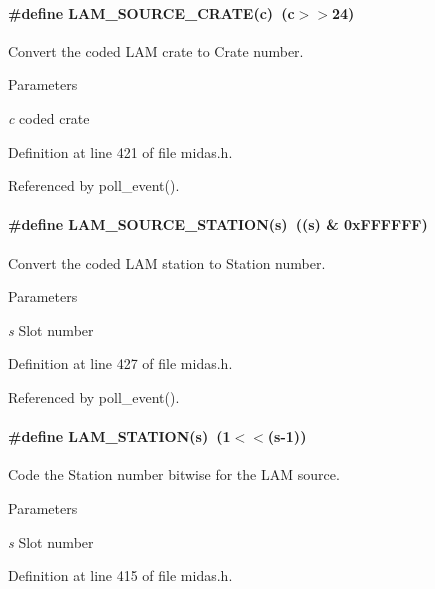 \paragraph[{LAM\_\-SOURCE\_\-CRATE}]{\setlength{\rightskip}{0pt plus 5cm}\#define LAM\_\-SOURCE\_\-CRATE(c)~(c$>$$>$24)}\hfill\label{group__midasincludecode_gafac465450c8035c37ba5482970e026eb}
Convert the coded LAM crate to Crate number. 
\begin{DoxyParams}{Parameters}
\item[{\em c}]coded crate \end{DoxyParams}


Definition at line 421 of file midas.h.

Referenced by poll\_\-event().
\paragraph[{LAM\_\-SOURCE\_\-STATION}]{\setlength{\rightskip}{0pt plus 5cm}\#define LAM\_\-SOURCE\_\-STATION(s)~((s) \& 0xFFFFFF)}\hfill\label{group__midasincludecode_gae70f372186346224788f2980de071736}
Convert the coded LAM station to Station number. 
\begin{DoxyParams}{Parameters}
\item[{\em s}]Slot number \end{DoxyParams}


Definition at line 427 of file midas.h.

Referenced by poll\_\-event().
\paragraph[{LAM\_\-STATION}]{\setlength{\rightskip}{0pt plus 5cm}\#define LAM\_\-STATION(s)~(1$<$$<$(s-\/1))}\hfill\label{group__midasincludecode_ga479219e07f43223f74ff8638705a804e}
Code the Station number bitwise for the LAM source. 
\begin{DoxyParams}{Parameters}
\item[{\em s}]Slot number \end{DoxyParams}


Definition at line 415 of file midas.h.
